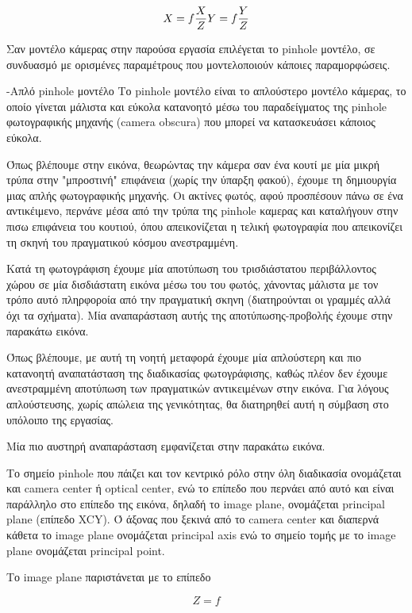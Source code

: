 \begin{equation}
X=f\frac{X}{Z}\\
Y=f\frac{Y}{Z}
\end{equation}

Σαν μοντέλο κάμερας στην παρούσα εργασία επιλέγεται το pinhole μοντέλο, σε συνδυασμό με ορισμένες παραμέτρους που μοντελοποιούν κάποιες παραμορφώσεις.

-Απλό pinhole μοντέλο
Το pinhole μοντέλο είναι το απλούστερο μοντέλο κάμερας, το οποίο γίνεται μάλιστα και εύκολα κατανοητό μέσω του παραδείγματος της pinhole φωτογραφικής μηχανής (camera obscura) που μπορεί να κατασκευάσει κάποιος εύκολα.

Όπως βλέπουμε στην εικόνα, θεωρώντας την κάμερα σαν ένα κουτί με μία μικρή τρύπα στην "μπροστινή" επιφάνεια (χωρίς την ύπαρξη φακού), έχουμε τη δημιουργία μιας απλής φωτογραφικής μηχανής. Οι ακτίνες φωτός, αφού προσπέσουν πάνω σε ένα αντικέιμενο, περνάνε μέσα από την τρύπα της pinhole καμερας και καταλήγουν στην πισω επιφάνεια του κουτιού, όπου απεικονίζεται η τελική φωτογραφία που απεικονίζει τη σκηνή του πραγματικού κόσμου ανεστραμμένη.

Κατά τη φωτογράφιση έχουμε μία αποτύπωση του τρισδιάστατου περιβάλλοντος χώρου σε μία δισδιάστατη εικόνα μέσω του του φωτός, χάνοντας μάλιστα με τον τρόπο αυτό πληρφοροία από την πραγματική σκηνη (διατηρούνται οι γραμμές αλλά όχι τα σχήματα). Μία αναπαράσταση αυτής της αποτύπωσης-προβολής έχουμε στην παρακάτω εικόνα.


Όπως βλέπουμε, με αυτή τη νοητή μεταφορά έχουμε μία απλούστερη και πιο κατανοητή αναπατάσταση της διαδικασίας φωτογράφισης, καθώς πλέον δεν έχουμε ανεστραμμένη αποτύπωση των πραγματικών αντικειμένων στην εικόνα. Για λόγους απλούστευσης, χωρίς απώλεια της γενικότητας, θα διατηρηθεί αυτή η σύμβαση στο υπόλοιπο της εργασίας.

Μία πιο αυστηρή αναπαράσταση εμφανίζεται στην παρακάτω εικόνα.

Το σημείο pinhole που πάιζει και τον κεντρικό ρόλο στην όλη διαδικασία ονομάζεται και camera center ή optical center, ενώ το επίπεδο που περνάει από αυτό και είναι παράλληλο στο επίπεδο της εικόνα, δηλαδή το image plane, ονομάζεται principal plane (επίπεδο XCY). Ό άξονας που ξεκινά από το camera center και διαπερνά κάθετα το image plane ονομάζεται principal axis ενώ το σημείο τομής με το image plane ονομάζεται principal point.

Το image plane παριστάνεται με το επίπεδο 

\begin{equation}
 Z = f
\end{equation}

